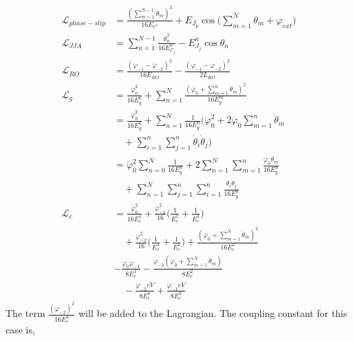 \documentclass[prx,showpacs,notitlepage,twocolumn,superscriptaddress,nofootinbib,preprintnumbers,floatfix]{revtex4-2}
\begin{document}
  \begin{align}
    \mathcal{L}_{phase-slip}&=\frac{(\sum_{m=1}^{N-1}\dot\theta_m)^2}{16E_{C'}}+E_{J_p}\cos\big(\sum_{m=1}^N\theta_m+\varphi_{ext}\big)\\
    \mathcal{L}_{JJA}&=\sum_{n=1}^{N-1}\frac{\dot{\theta}_n^2}{16E^{n}_{C_j}}-E^{n}_{J_j}\cos{\theta_n}\\
    \mathcal{L}_{RO}&=\frac{(\dot{\varphi}_{-1}-\dot{\varphi}_{-2})^2}{16E_{{RO}}}-\frac{(\varphi_{-1}-\varphi_{-2})^2}{2L_{RO}}\\
    \mathcal{L}_{g}&=\frac{\dot{\varphi}_0^2}{16E^0_{g}}+\sum_{n=1}^N \frac{(\dot{\varphi_0}+\sum_{m=1}^n\dot{\theta}_m)^2}{16E^m_{g}}\\
    &=\frac{\dot{\varphi}_0^2}{16E^0_{g}}+\sum_{n=1}^N \frac{1}{16E^n_{g}}(\dot{\varphi}_0^2+2\dot{\varphi}_0\sum_{m=1}^n\dot{\theta}_m\nonumber\\&\quad+\sum_{i=1}^n\sum_{j=1}^{n}\dot{\theta}_i\dot{\theta}_j)\\
    &=\dot{\varphi}_0^2\sum_{n=0}^N\frac{1}{16E^n_g}+2\sum_{n=1}^N\sum_{m=1}^n\frac{\dot{\varphi}_0\dot{\theta}_m}{16E^n_{g}}\nonumber\\&\quad+\sum_{n=1}^N\sum_{j=1}^n\sum_{i=1}^{n}\frac{\dot{\theta}_i\dot{\theta}_j}{16E^n_{g}}\\
    \mathcal{L}_{c}&=\frac{\dot{\varphi}^2_0}{16E^1_c}+\frac{\dot{\varphi}^2_{-1}}{16}\Big(\frac{1}{E^1_c}+\frac{1}{E^3_c}\Big)\nonumber\\
    &\quad+\frac{\dot{\varphi}^2_{-2}}{16}\Big(\frac{1}{E^4_c}+\frac{1}{E^2_c}\Big)+\frac{(\dot{\varphi}_0+\sum_{m=1}^N\dot{\theta}_m)^2}{16E^2_c}\nonumber\\
  &-\frac{\dot{\varphi}_0\dot{\varphi}_{-1}}{8E^1_c}-\frac{\dot{\varphi}_{-2}(\dot{\varphi}_{0}+\sum_{m=1}^N\dot{\theta}_m)}{8E^2_c}\nonumber\\
    &\quad-\frac{\dot{\varphi}_{-2}eV}{8E^4_c}+\frac{\dot{\varphi}_{-1}eV}{8E^3_c}
\end{align}
The term $\frac{(\dot{\varphi}_{-2})^2}{16E^4_{c}}$ will be added to the Lagrangian. The coupling constant for this case is,
\end{document}
